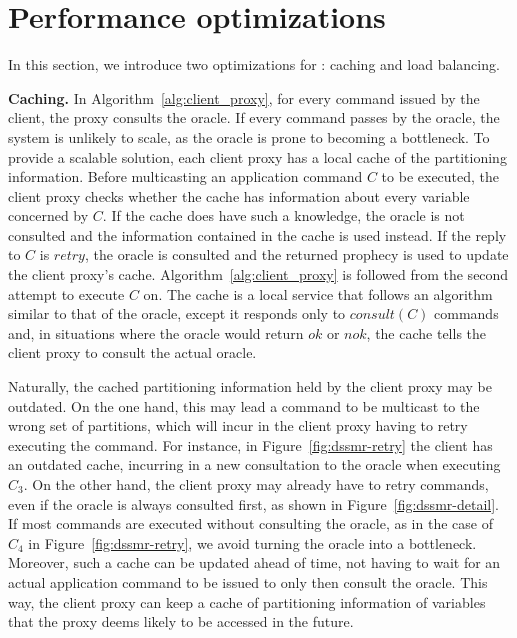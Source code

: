 \section{Performance optimizations}
\label{sec:dssmr-optm}

In this section, we introduce two optimizations for \dssmr{}: caching and load
balancing.

\textbf{Caching.} In Algorithm~\ref{alg:client_proxy}, for every command issued
by the client, the proxy consults the oracle. If every command passes by the
oracle, the system is unlikely to scale, as the oracle is prone to becoming a
bottleneck. To provide a scalable solution, each client proxy has a local cache
of the partitioning information. Before multicasting an application command $C$
to be executed, the client proxy checks whether the cache has information about
every variable concerned by $C$. If the cache does have such a knowledge, the
oracle is not consulted and the information contained in the cache is used
instead. If the reply to $C$ is $retry$, the oracle is consulted and the
returned prophecy is used to update the client proxy's cache.
Algorithm~\ref{alg:client_proxy} is followed from the second attempt to execute
$C$ on. The cache is a local service that follows an algorithm similar to that
of the oracle, except it responds only to $consult(C)$ commands and, in
situations where the oracle would return $ok$ or $nok$, the cache tells the
client proxy to consult the actual oracle.


Naturally, the cached partitioning information held by the client proxy may be
outdated. On the one hand, this may lead a command to be multicast to the
wrong set of partitions, which will incur in the client proxy having to
retry executing the command. For instance, in Figure~\ref{fig:dssmr-retry} the
client has an outdated cache, incurring in a new consultation to the oracle
when executing $C_3$. On the other hand, the client proxy may already have to
retry commands, even if the oracle is always consulted first, as shown in
Figure~\ref{fig:dssmr-detail}. If most commands are executed without consulting
the oracle, as in the case of $C_4$ in Figure~\ref{fig:dssmr-retry}, we avoid
turning the oracle into a bottleneck. Moreover, such a cache can be updated
ahead of time, not having to wait for an actual application command to be issued
to only then consult the oracle. This way, the client proxy can keep a cache of
partitioning information of variables that the proxy deems likely to be accessed
in the future.

